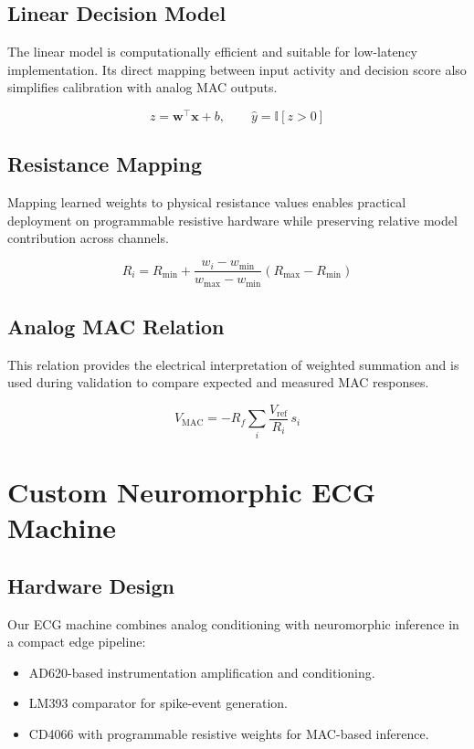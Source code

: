 \documentclass[12pt,a4paper]{article}
\begin{document}
\subsection{Linear Decision Model}

The linear model is computationally efficient and suitable for low-latency implementation. Its direct mapping between input activity and decision score also simplifies calibration with analog MAC outputs.

\begin{equation}
z=\mathbf{w}^{\top}\mathbf{x}+b,\qquad \hat{y}=\mathbb{I}[z>0]
\end{equation}

\subsection{Resistance Mapping}

Mapping learned weights to physical resistance values enables practical deployment on programmable resistive hardware while preserving relative model contribution across channels.

\begin{equation}
R_i=R_{\min}+\frac{w_i-w_{\min}}{w_{\max}-w_{\min}}(R_{\max}-R_{\min})
\end{equation}

\subsection{Analog MAC Relation}

This relation provides the electrical interpretation of weighted summation and is used during validation to compare expected and measured MAC responses.

\begin{equation}
V_{\text{MAC}}=-R_f\sum_i \frac{V_{\text{ref}}}{R_i}\,s_i
\end{equation}

\section{Custom Neuromorphic ECG Machine}

\subsection{Hardware Design}

Our ECG machine combines analog conditioning with neuromorphic inference in a compact edge pipeline:
\begin{itemize}
  \item AD620-based instrumentation amplification and conditioning.
  \item LM393 comparator for spike-event generation.
  \item CD4066 with programmable resistive weights for MAC-based inference.
\end{itemize}
\end{document}
